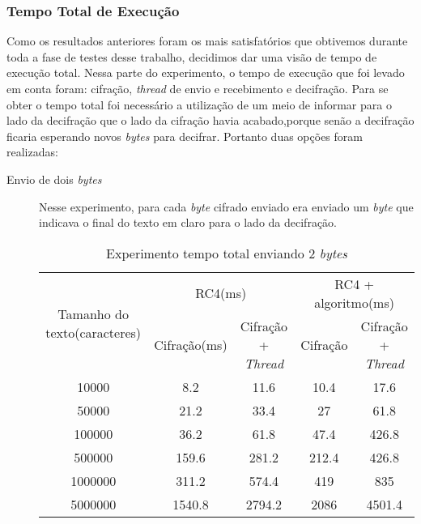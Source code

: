 \subsubsection{Tempo Total de Execução}

Como os resultados anteriores foram os mais satisfatórios que obtivemos durante toda a fase de testes desse trabalho, decidimos dar uma visão de tempo de execução total. Nessa parte do experimento, o tempo de execução que foi levado em conta foram: cifração, \textit{thread} de envio e recebimento e decifração. Para se obter o tempo total foi necessário a utilização de um meio de informar para o lado da decifração que o lado da cifração havia acabado,porque senão a decifração ficaria esperando novos \textit{bytes} para decifrar. Portanto duas opções foram realizadas:

\begin{description}
	\item [Envio de dois \textit{bytes}] Nesse experimento, para cada \textit{byte} cifrado enviado era enviado um \textit{byte} que indicava o final do texto em claro para o lado da decifração.
	
	\begin{table}[h]
\begin{tabular}{|c|c|c|c|c|}
\hline
\multirow{2}{3cm}{Tamanho do texto(caracteres)} & \multicolumn{2}{c|}{RC4(ms)}     & \multicolumn{2}{c|}{RC4 + algoritmo(ms)} \\ \cline{2-5} 
                                     & Cifração(ms) & Cifração + \textit{Thread} & Cifração     & Cifração + \textit{Thread}    \\ \hline
10000                                & 8.2      & 11.6              & 10.4         & 17.6                  \\ \hline
50000                                & 21.2     & 33.4              & 27           & 61.8                  \\ \hline
100000                               & 36.2     & 61.8              & 47.4         & 426.8                 \\ \hline
500000                               & 159.6    & 281.2             & 212.4        & 426.8                 \\ \hline
1000000                              & 311.2    & 574.4             & 419          & 835                   \\ \hline
5000000                              & 1540.8   & 2794.2            & 2086         & 4501.4                \\ \hline
\end{tabular}
\caption{Experimento tempo total enviando 2 \textit{bytes}}
\end{table}


\end{description}
